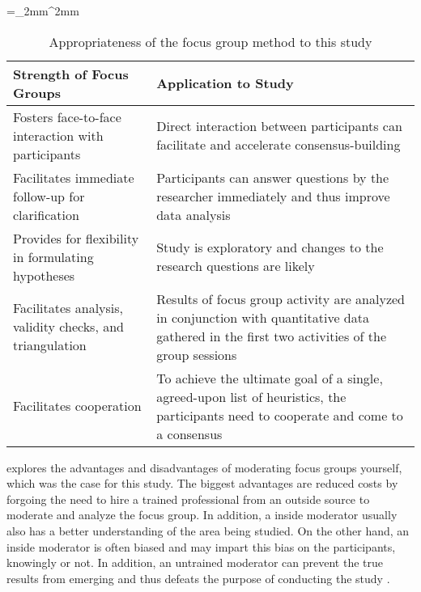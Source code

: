 \begin{table}[hbtp]
	\centering
	\tabulinesep=_2mm^2mm
	\caption[Appropriateness of focus group method to study]{Appropriateness of the focus group method to this study \citep[wording of strengths taken from][]{Marshall1999}}
	\begin{tabu} to \textwidth {X[1,l] X[1,l]} \toprule
		\textbf{Strength of Focus Groups} & \textbf{Application to Study} \\ \midrule
		Fosters face-to-face interaction with participants & Direct interaction between participants can facilitate and accelerate consensus-building \\
		Facilitates immediate follow-up for clarification & Participants can answer questions by the researcher immediately and thus improve data analysis \\
		Provides for flexibility in formulating hypotheses & Study is exploratory and changes to the research questions are likely \\
		Facilitates analysis, validity checks, and triangulation & Results of focus group activity are analyzed in conjunction with quantitative data gathered in the first two activities of the group sessions \\
		Facilitates cooperation & To achieve the ultimate goal of a single, agreed-upon list of heuristics, the participants need to cooperate and come to a consensus \\
		\bottomrule
	\end{tabu}
	\label{tab:focus_group_appropriateness}
\end{table}

 explores the advantages and disadvantages of moderating focus groups yourself, which was the case for this study. The biggest advantages are reduced costs by forgoing the need to hire a trained professional from an outside source to moderate and analyze the focus group. In addition, a inside moderator usually also has a better understanding of the area being studied. On the other hand, an inside moderator is often biased and may impart this bias on the participants, knowingly or not. In addition, an untrained moderator can prevent the true results from emerging and thus defeats the purpose of conducting the study \citep{Edmunds1999}.

